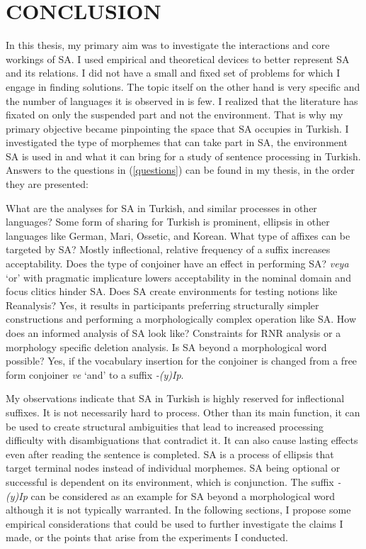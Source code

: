 \chapter{\MakeUppercase{conclusion}}

In this thesis, my primary aim was to investigate the interactions and core workings of SA. I used empirical and theoretical devices to better represent SA and its relations. I did not have a small and fixed set of problems for which I engage in finding solutions. The topic itself on the other hand is very specific and the number of languages it is observed in is few. I realized that the literature has fixated on only the suspended part and not the environment. That is why my primary objective became pinpointing the space that SA occupies in Turkish. I investigated the type of morphemes that can take part in SA, the environment SA is used in and what it can bring for a study of sentence processing in Turkish. Answers to the questions in (\ref{questions}) can be found in my thesis, in the order they are presented:

\begin{exe}
\ex \label{questions}
\begin{xlisti}
    \ex What are the analyses for SA in Turkish, and similar processes in other languages? Some form of sharing for Turkish is prominent, ellipsis in other languages like German, Mari, Ossetic, and Korean.
    \ex What type of affixes can be targeted by SA? Mostly inflectional, relative frequency of a suffix increases acceptability.
    \ex Does the type of conjoiner have an effect in performing SA? \textit{veya} `or' with pragmatic implicature lowers acceptability in the nominal domain and focus clitics hinder SA.
    \ex Does SA create environments for testing notions like Reanalysis? Yes, it results in participants preferring structurally simpler constructions and performing a morphologically complex operation like SA.
    \ex How does an informed analysis of SA look like? Constraints for RNR analysis or a morphology specific deletion analysis.
    \ex Is SA beyond a morphological word possible? Yes, if the vocabulary insertion for the conjoiner is changed from a free form conjoiner \textit{ve} `and' to a suffix \textit{-(y)Ip}.  
\end{xlisti}
\end{exe}

My observations indicate that SA in Turkish is highly reserved for inflectional suffixes. It is not necessarily hard to process. Other than its main function, it can be used to create structural ambiguities that lead to increased processing difficulty with disambiguations that contradict it. It can also cause lasting effects even after reading the sentence is completed. SA is a process of ellipsis that target terminal nodes instead of individual morphemes. SA being optional or successful is dependent on its environment, which is conjunction. The suffix \textit{-(y)Ip} can be considered as an example for SA beyond a morphological word although it is not typically warranted. In the following sections, I propose some empirical considerations that could be used to further investigate the claims I made, or the points that arise from the experiments I conducted.


